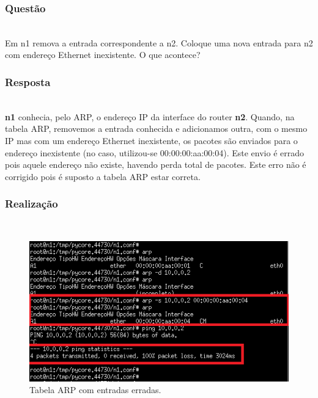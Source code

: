 \documentclass{llncs}
\begin{document}
\subsubsection{Questão}\rule[-10pt]{0pt}{10pt}\\

Em n1 remova a entrada correspondente a n2. Coloque uma nova entrada para n2 com endereço Ethernet inexistente. O que acontece?

\subsubsection{Resposta}\rule[-10pt]{0pt}{10pt}\\

\textbf{n1} conhecia, pelo ARP, o endereço IP da interface do router \textbf{n2}. Quando, na tabela ARP, removemos a entrada conhecida e adicionamos outra, com o mesmo IP mas com um endereço Ethernet inexistente, os pacotes são enviados para o endereço inexistente (no caso, utilizou-se 00:00:00:aa:00:04). Este envio é errado pois aquele endereço não existe, havendo perda total de pacotes. Este erro não é corrigido pois é suposto a tabela ARP estar correta.

\subsubsection{Realização}\rule[-10pt]{0pt}{10pt}\\

\begin{figure}
  \begin{center}
    \includegraphics[scale=0.6]{./imagens/5_19.png} 
  \end{center}
  \caption{Tabela ARP com entradas erradas.}
  \label{fig:5_19}
\end{figure} 

\clearpage
\end{document}
